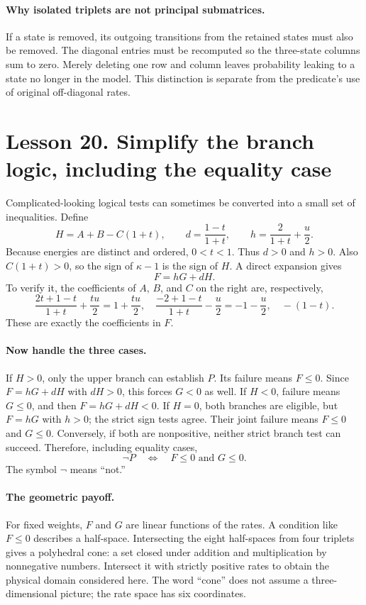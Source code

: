 \paragraph{Why isolated triplets are not principal submatrices.}
If a state is removed, its outgoing transitions from the retained states
must also be removed. The diagonal entries must be recomputed so the
three-state columns sum to zero. Merely deleting one row and column leaves
probability leaking to a state no longer in the model. This distinction is
separate from the predicate's use of original off-diagonal rates.

\clearpage
\section*{Lesson 20. Simplify the branch logic, including the equality case}
Complicated-looking logical tests can sometimes be converted into a small
set of inequalities. Define
\[
H=A+B-C(1+t),\qquad d=\frac{1-t}{1+t},
\qquad h=\frac2{1+t}+\frac u2.
\]
Because energies are distinct and ordered, $0<t<1$. Thus $d>0$ and $h>0$.
Also $C(1+t)>0$, so the sign of $\kappa-1$ is the sign of $H$.
A direct expansion gives
\[
F=hG+dH.
\]
To verify it, the coefficients of $A$, $B$, and $C$ on the right are,
respectively,
\[
\frac{2t+1-t}{1+t}+\frac{tu}{2}=1+\frac{tu}{2},
\quad\frac{-2+1-t}{1+t}-\frac u2=-1-\frac u2,
\quad-(1-t).
\]
These are exactly the coefficients in $F$.

\paragraph{Now handle the three cases.}
If $H>0$, only the upper branch can establish $P$. Its failure means
$F\leq0$. Since $F=hG+dH$ with $dH>0$, this forces $G<0$ as well.
If $H<0$, failure means $G\leq0$, and then $F=hG+dH<0$.
If $H=0$, both branches are eligible, but $F=hG$ with $h>0$; the strict
sign tests agree. Their joint failure means $F\leq0$ and $G\leq0$.
Conversely, if both are nonpositive, neither strict branch test can succeed.
Therefore, including equality cases,
\[
\neg P\quad\Longleftrightarrow\quad F\leq0\text{ and }G\leq0.
\]
The symbol $\neg$ means ``not.''

\paragraph{The geometric payoff.}
For fixed weights, $F$ and $G$ are linear functions of the rates. A condition
like $F\leq0$ describes a half-space. Intersecting the eight half-spaces from
four triplets gives a polyhedral cone: a set closed under addition and
multiplication by nonnegative numbers. Intersect it with strictly positive
rates to obtain the physical domain considered here. The word ``cone'' does
not assume a three-dimensional picture; the rate space has six coordinates.


